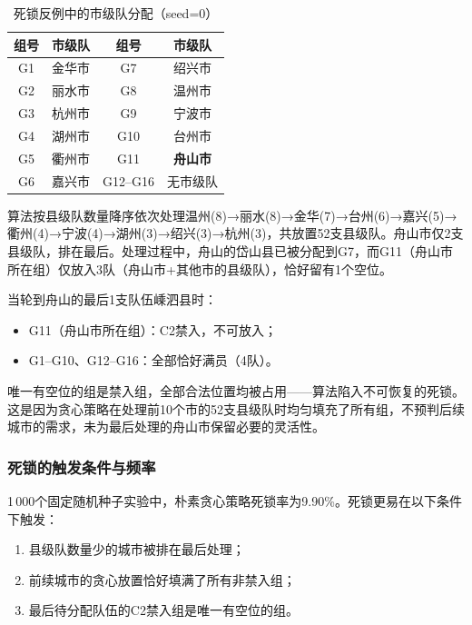 \documentclass[12pt,a4paper]{article}
\begin{document}
\begin{table}[H]
  \centering
  \caption{死锁反例中的市级队分配（seed=0）}
  \label{tab:deadlock_mun}
  \begin{tabular}{cccc}
    \toprule
    组号 & 市级队 & 组号 & 市级队 \\
    \midrule
    G1 & 金华市 & G7 & 绍兴市 \\
    G2 & 丽水市 & G8 & 温州市 \\
    G3 & 杭州市 & G9 & 宁波市 \\
    G4 & 湖州市 & G10 & 台州市 \\
    G5 & 衢州市 & G11 & \textbf{舟山市} \\
    G6 & 嘉兴市 & G12--G16 & 无市级队 \\
    \bottomrule
  \end{tabular}
\end{table}

算法按县级队数量降序依次处理温州(8)→丽水(8)→金华(7)→台州(6)→嘉兴(5)→衢州(4)→宁波(4)→湖州(3)→绍兴(3)→杭州(3)，共放置52支县级队。舟山市仅2支县级队，排在最后。处理过程中，舟山的岱山县已被分配到G7，而G11（舟山市所在组）仅放入3队（舟山市+其他市的县级队），恰好留有1个空位。

当轮到舟山的最后1支队伍嵊泗县时：

\begin{itemize}
  \item G11（舟山市所在组）：C2禁入，不可放入；
  \item G1--G10、G12--G16：全部恰好满员（4队）。
\end{itemize}

唯一有空位的组是禁入组，全部合法位置均被占用——算法陷入不可恢复的死锁。这是因为贪心策略在处理前10个市的52支县级队时均匀填充了所有组，不预判后续城市的需求，未为最后处理的舟山市保留必要的灵活性。

\subsubsection{死锁的触发条件与频率}

1\,000个固定随机种子实验中，朴素贪心策略死锁率为9.90\%。死锁更易在以下条件下触发：

\begin{enumerate}[(1)]
  \item 县级队数量少的城市被排在最后处理；
  \item 前续城市的贪心放置恰好填满了所有非禁入组；
  \item 最后待分配队伍的C2禁入组是唯一有空位的组。
\end{enumerate}
\end{document}
